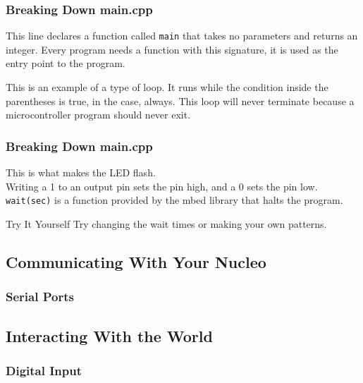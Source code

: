 \begin{frame}[fragile]
	\frametitle{Breaking Down main.cpp}
	
	This line declares a function called \lstinline{main} that takes no parameters and returns an integer.
	Every program needs a function with this signature, it is used as the entry point to the program.
	
	
	This is an example of a type of loop.
	It runs while the condition inside the parentheses is true, in the case, always.
	This loop will never terminate because a microcontroller program should never exit.
\end{frame}

\begin{frame}[fragile]
	\frametitle{Breaking Down main.cpp}
	
	This is what makes the LED flash.\\
	Writing a 1 to an output pin sets the pin high, and a 0 sets the pin low.
	\lstinline{wait(sec)} is a function provided by the mbed library that halts the program.
	\begin{block}{Try It Yourself}
		Try changing the wait times or making your own patterns.
	\end{block}
\end{frame}

\subsection{Communicating With Your Nucleo}
\begin{frame}
	\frametitle{Serial Ports}
\end{frame}

\subsection{Interacting With the World}
\begin{frame}
	\frametitle{Digital Input}
\end{frame}